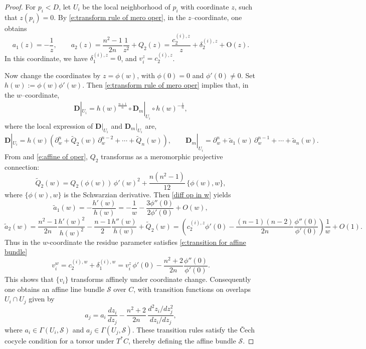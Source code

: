 \documentclass[twoside, 11pt]{article}
\numberwithin{equation}{section}
\theoremstyle{theorem}
\numberwithin{theorem}{section}
\theoremstyle{definition}
\begin{document}
\begin{proof}
For \(p_i < D\), let \(U_i\) be the local neighborhood of $p_i$ with coordinate \(z\), such that \(z(p_i)=0\). 
By \eqref{e:transform rule of mero oper}, in the $z$--coordinate, one obtains
\[
a_1(z) = -\frac{1}{z}, \qquad
a_2(z) = \frac{n^2-1}{2n}\frac{1}{z^2}+Q_2(z)
       = \frac{c_2^{(i),z}}{z}+\delta_2^{(i),z}+ \mathrm O(z).
\]
In this coordinate, we have $\delta^{(i),z}_1=0$, and \(v_i^z=c_2^{(i),z}\).

Now change the coordinates by \(z=\phi(w)\), with \(\phi(0)=0\) and \(\phi'(0)\neq 0\). Set
\(
h(w):=\phi(w)\phi'(w).
\)
Then \eqref{e:transform rule of mero oper} implies that, in the \(w\)–coordinate,
\begin{align}\label{diff op in w}
  \mathbf{D}|_{U_i} 
  = h(w)^{\frac{n+1}{n}} \circ \mathbf{D}_m|_{U_i}
  \circ h(w)^{-\frac{1}{n}},
\end{align}
where the local expression of $\mathbf{D}|_{U_i}$ and $\mathbf{D}_m|_{U_i}$ are,
\[
  \mathbf{D}|_{U_i} = h(w) \left( \partial_w^n + \widetilde Q_2(w)\,\partial_w^{n-2} + \cdots + \widetilde Q_n(w) \right), 
  \qquad
  \mathbf{D}_m|_{U_i} = \partial_w^n + \widetilde a_1(w)\,\partial_w^{n-1}+\cdots+\widetilde a_n(w).
\]
From  and \eqref{e:affine of oper}, \(Q_2\) transforms 
as a meromorphic projective connection:
\[
\widetilde Q_2(w) = Q_2(\phi(w))\,\phi'(w)^2 + \frac{n(n^2-1)}{12}\,\{\phi(w),w\},
\]
where \(\{\phi(w),w\}\) is the Schwarzian derivative.  
Then \eqref{diff op in w} yields
\[
\widetilde a_1(w) = -\frac{h'(w)}{h(w)} 
       = -\frac{1}{w} - \frac{3\phi''(0)}{2\phi'(0)} + O(w),
\]
\[
\widetilde a_2(w) = \frac{n^2-1}{2n}\frac{h'(w)^2}{h(w)^2}
        - \frac{n-1}{2}\frac{h''(w)}{h(w)}+ \widetilde Q_2(w)
        = \left(c_2^{(i),z}\phi'(0)-\frac{(n-1)(n-2)}{2n}\frac{\phi''(0)}{\phi'(0)}\right)\frac{1}{w}+O(1).
\]
Thus in the \(w\)-coordinate the residue parameter satisfies \eqref{e:transition for affine bundle}
$$
v_i^w = c_2^{(i),w}+\delta_1^{(i),w}
      = v_i^z\,\phi'(0)-\frac{n^2+2}{2n}\frac{\phi''(0)}{\phi'(0)}.
$$
This shows that \(\{v_i\}\) transforms affinely under coordinate change.  
Consequently one obtains an affine line bundle \(\mathcal{S}\) over \(C\), 
with transition functions on overlaps \(U_i \cap U_j\) given by
\begin{equation}\label{e:transition for aff bun}
a_j 
   = a_i\,\frac{dz_i}{dz_j}
     - \frac{n^2+2}{2n}\,
       \frac{d^2 z_i / dz_j^2}{dz_i / dz_j},
\end{equation}
where \(a_i \in \Gamma(U_i, \mathcal{S})\) and \(a_j \in \Gamma(U_j, \mathcal{S})\).  
These transition rules satisfy the Čech cocycle condition for a torsor under \(T^*C\), 
thereby defining the affine bundle \(\mathcal{S}\).
\end{proof}
\end{document}
